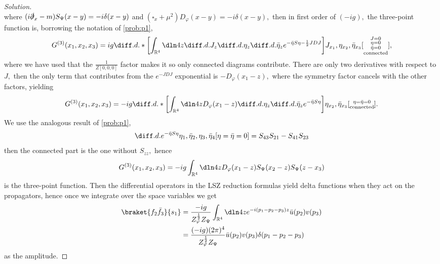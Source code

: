 \begin{proof}[Solution]
\begin{equation*}
   \end{equation*}
   where \((i \slashed{\partial}_{x} - m) S_\Psi(x-y) = -i \delta(x - y)\) and \((\square_x + \mu^2) D_\varphi(x-y) = -i \delta(x - y),\) then in first order of \((-ig),\) the three-point function is, borrowing the notation of \cref{prob:p1},
   \begin{equation*}
      G^{(3)}(x_1,x_2,x_3) = ig\diff.d.*{\left[\int_{\mathbb{R}^4} \dln4z \diff.d.{}{J_z} \diff.d.{}{\eta_z} \diff.d.{}{\bar{\eta}_z}e^{- \bar{\eta} S \eta - \frac12 J D J}\right]}{J_{x_1},\eta_{x_2},\bar{\eta}_{x_3}}[\substack{J = 0\\\eta = 0\\ \bar{\eta} = 0\\\mathrm{connected}}],
   \end{equation*}
   where we have used that the \(\frac{1}{Z[0,0,0]}\) factor makes it so only connected diagrams contribute. There are only two derivatives with respect to \(J,\) then the only term that contributes from the \(e^{-JDJ}\) exponential is \(-D_\varphi(x_1 - z),\) where the symmetry factor cancels with the other factors, yielding
   \begin{equation*}
      G^{(3)}(x_1,x_2,x_3) = -ig\diff.d.*{\left[\int_{\mathbb{R}^4} \dln4z D_\varphi(x_1 - z) \diff.d.{}{\eta_z} \diff.d.{}{\bar{\eta}_z}e^{- \bar{\eta} S \eta}\right]}{\eta_{x_2},\bar{\eta}_{x_3}}[\substack{\eta = \bar{\eta} = 0\\\mathrm{connected}}].
   \end{equation*}
   We use the analogous result of \cref{prob:p1},
   \begin{equation*}
      \diff.d.{e^{- \bar{\eta} S \eta}}{\eta_1,\bar{\eta}_2,\eta_3,\bar{\eta}_4}[\eta = \bar{\eta} = 0] = S_{43}S_{21} - S_{41}S_{23}
   \end{equation*}
   then the connected part is the one without \(S_{zz},\) hence
   \begin{equation*}
      G^{(3)}(x_1,x_2,x_3) = -ig \int_{\mathbb{R}^4} \dln4z D_\varphi(x_1 - z) S_\Psi(x_2 - z) S_\Psi(z - x_3)
   \end{equation*}
   is the three-point function. Then the differential operators in the LSZ reduction formulas yield delta functions when they act on the propagators, hence once we integrate over the space variables we get
   \begin{align*}
      \braket{f_2 \bar{f}_3}{s_1} &= \frac{-ig}{Z_\varphi^{\frac12} Z_\Psi} \int_{\mathbb{R}^4} \dln4z e^{-i(p_1 - p_2 - p_3)z} \bar{u}(p_2) v(p_3)\\
                                  &= \frac{(-ig)(2\pi)^4}{Z_\varphi^{\frac12} Z_\Psi} \bar{u}(p_2)v(p_3) \delta(p_1 - p_2 - p_3)
   \end{align*}
   as the amplitude.
\end{proof}
